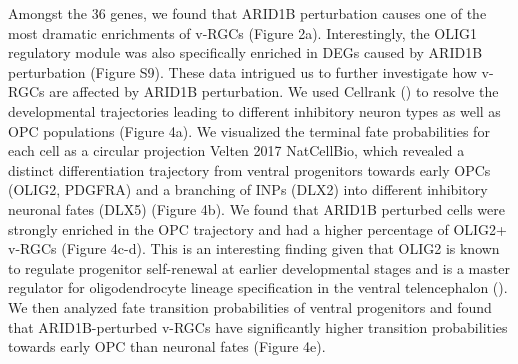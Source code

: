 Amongst the 36 genes, we found that ARID1B perturbation causes one of the most dramatic enrichments of v-RGCs (Figure 2a). Interestingly, the OLIG1 regulatory module was also specifically enriched in DEGs caused by ARID1B perturbation (Figure S9). These data intrigued us to further investigate how v-RGCs are affected by ARID1B perturbation. We used Cellrank (\cite{lange_cellrank_2022}) to resolve the developmental trajectories leading to different inhibitory neuron types as well as OPC populations (Figure 4a). We visualized the terminal fate probabilities for each cell as a circular projection {Velten 2017 NatCellBio}, which revealed a distinct differentiation trajectory from ventral progenitors towards early OPCs (OLIG2, PDGFRA) and a branching of INPs (DLX2) into different inhibitory neuronal fates (DLX5) (Figure 4b). We found that ARID1B perturbed cells were strongly enriched in the OPC trajectory and had a higher percentage of OLIG2+ v-RGCs (Figure 4c-d). This is an interesting finding given that OLIG2 is known to regulate progenitor self-renewal at earlier developmental stages and is a master regulator for oligodendrocyte lineage specification in the ventral telencephalon (\cite{petryniak_dlx1_2007,sun_phosphorylation_2011}). We then analyzed fate transition probabilities of ventral progenitors and found that ARID1B-perturbed v-RGCs have significantly higher transition probabilities towards early OPC than neuronal fates (Figure 4e).

